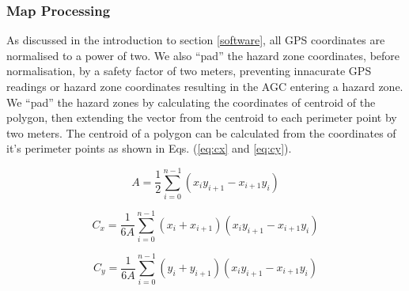 \documentclass[11pt,landscape]{article}
\begin{document}
\begin{multicols}{3}
\subsubsection{Map Processing}
As discussed in the introduction to section \ref{software}, all GPS coordinates
are normalised to a power of two. We also ``pad'' the hazard zone coordinates,
before normalisation, by a safety factor of two meters, preventing innacurate
GPS readings or hazard zone coordinates resulting in the AGC entering a hazard
zone. We ``pad'' the hazard zones by calculating the coordinates of centroid of
the polygon, then extending the vector from the centroid to each perimeter point
by two meters. The centroid of a polygon can be calculated from the coordinates
of it's perimeter points as shown in Eqs. (\ref{eq:cx} and \ref{eq:cy}).
\begin{center}
    \begin{equation*}
        A=\frac{1}{2}\sum_{i=0}^{n-1}\left( x_i y_{i+1} - x_{i+1} y_i\right)
    \end{equation*}
\end{center}
\begin{center}
    \begin{equation}
        C_x=\frac{1}{6A}\sum_{i=0}^{n-1} (x_i + x_{i+1}) (x_i y_{i+1} - x_{i+1} y_i)
        \label{eq:cx}
    \end{equation}
\end{center}
\begin{center}
    \begin{equation}
        C_y=\frac{1}{6A}\sum_{i=0}^{n-1} (y_i + y_{i+1}) (x_i y_{i+1} - x_{i+1} y_i)
        \label{eq:cy}
    \end{equation}
\end{center}

\end{multicols}
\end{document}

